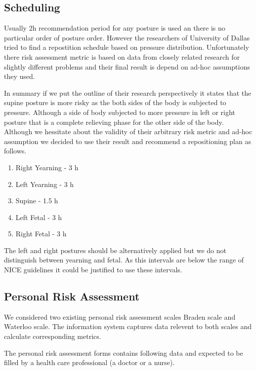 \subsection{Scheduling}

Usually 2h recommendation period for any posture is used an there is no particular order of posture order. However the researchers of University of Dallas tried to find a repostition schedule based on pressure distribution. Unfortunately there risk assessment metric is based on data from closely related research for slightly different problems and their final result is depend on ad-hoc assumptions they used. 

In summary if we put the outline of their research perspectively it states that the supine posture is more risky as the both sides of the body is subjected to pressure. Although a side of body subjected to more pressure in left or right posture that is a complete relieving phase for the other side of the body. Although we hessitate about the validity of their arbitrary risk metric and ad-hoc assumption we decided to use their result and recommend a repositioning plan as follows. 

\begin{enumerate}
	\item Right Yearning - 3 h
	\item Left Yearning - 3 h
	\item Supine - 1.5 h
	\item Left Fetal - 3 h
	\item Right Fetal - 3 h
\end{enumerate}

The left and right postures should be alternatively applied but we do not distinguish between yearning and fetal. As this intervals are below the range of NICE guidelines it could be justified to use these intervals. 

\subsection{Personal Risk Assessment}

We considered two existing personal risk assessment scales Braden scale and Waterloo scale. The information system captures data relevent to both scales and calculate corresponding metrics. 

The personal risk assessment forms contains following data and expected to be filled by a health care professional (a doctor or a nurse). 

